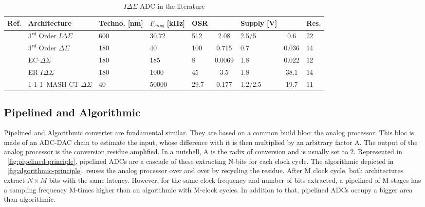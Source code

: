 \begin{table}[htp]
	\caption{\(I\Delta\Sigma \)-ADC in the literature}
	\centering
	\label{table:sigma_delta_comparison_table}
	\begin{tabular}{L{3.5\charwidth} R{16.5\charwidth} R{6\charwidth} C{5\charwidth} R{4\charwidth} S[table-format=2.2, table-column-width=6\charwidth] R{6\charwidth} S[table-format=2.2, table-column-width=6\charwidth] C{3.5\charwidth}}
	\toprule
	Ref. & Architecture & Techno. [nm] & \(F_{snyq}\) [kHz] & OSR & {} & Supply [V] & {} & Res. \\ 
	\midrule
	\cite{Quiquempoix2006} & \(3^{rd}\) Order \(I\Delta\Sigma \) & 600 & 30.72 & 512 & 2.08 & 2.5/5 & 0.6 & 22 \\
	\cite{Chae2009} & \(3^{rd}\) Order \(\Delta\Sigma \) & 180 & 40 & 100 & 0.715 & 0.7 & 0.036 & 14 \\
	\cite{Jeon2017} & EC-\(\Delta\Sigma \) & 180 & 185 & 8 & 0.0069 & 1.8 & 0.022 & 12 \\
	\cite{Agah2010} & ER-\(I\Delta\Sigma \) & 180 & 1000 & 45 & 3.5 & 1.8 & 38.1 & 14 \\
	\cite{Liu2017} & 1-1-1~MASH CT-\(\Delta\Sigma \) & 40 & 50000 & 29.7 & 0.177 & 1.2/2.5 & 19.7 & 11 \\
	\bottomrule
	\end{tabular}
\end{table}

\subsection{Pipelined and Algorithmic}               %
\label{sec:pipe-adc}
Pipelined and Algorithmic converter are fundamental similar. They are based on a common build bloc: the analog processor. This bloc is made of an ADC-DAC chain to estimate the input, whose difference with it is then multiplied by an arbitrary factor A. The output of the analog processor is the conversion residue amplified. In a nutshell, A is the radix of conversion and is usually set to 2. Represented in \figurename~\ref{fig:pipelined-principle}, pipelined ADCs are a cascade of these extracting N-bits for each clock cycle. The algorithmic depicted in \figurename~\ref{fig:algorithmic-principle}, reuses the analog processor over and over by recycling the residue. After M clock cycle, both architectures extract $N\times M$ bits with the same latency. However, for the same clock frequency and number of bits extracted, a pipelined of M-stages has a sampling frequency M-times higher than an algorithmic with M-clock cycles. In addition to that, pipelined ADCs occupy a bigger area than algorithmic.

